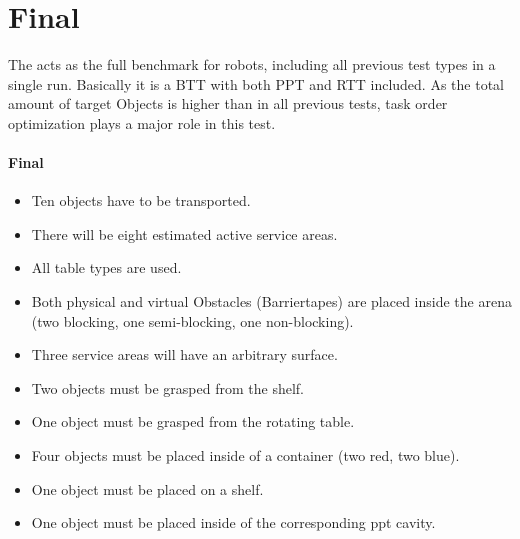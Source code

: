\section{Final}
\label{sec:Final}

The  acts as the full benchmark for robots, including all previous test types in a single run. Basically it is a BTT with both PPT and RTT included.
As the total amount of target Objects is higher than in all previous tests, task order optimization plays a major role in this test.

\paragraph{Final}
\begin{itemize}
\item Ten objects have to be transported.
\item There will be eight estimated active service areas.
\item All table types are used.
\item Both physical and virtual Obstacles (Barriertapes) are placed inside the arena (two blocking, one semi-blocking, one non-blocking).
\item Three service areas will have an arbitrary surface.
\item Two objects must be grasped from the shelf.
\item One object must be grasped from the rotating table.
\item Four objects must be placed inside of a container (two red, two blue). 
\item One object must be placed on a shelf.
\item One object must be placed inside of the corresponding ppt cavity.
\end{itemize}


